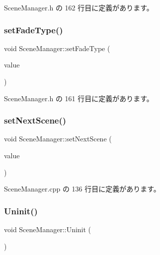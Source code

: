  Scene\+Manager.\+h の 162 行目に定義があります。

\mbox{\label{class_scene_manager_a95bb32ee4d3461bf56381d288a98c61b}} 
\subsubsection{\texorpdfstring{set\+Fade\+Type()}{setFadeType()}}
{\footnotesize\ttfamily void Scene\+Manager\+::set\+Fade\+Type (\begin{DoxyParamCaption}\item[{\mbox{\hyperlink{class_fade_ac06f27215b454aa05b93c236476d6e80}{Fade\+::\+Type}}}]{value }\end{DoxyParamCaption})\hspace{0.3cm}{\ttfamily [inline]}}



 Scene\+Manager.\+h の 161 行目に定義があります。

\mbox{\label{class_scene_manager_a208cc1690dcb260ae7fb94d13118f6ce}} 
\subsubsection{\texorpdfstring{set\+Next\+Scene()}{setNextScene()}}
{\footnotesize\ttfamily void Scene\+Manager\+::set\+Next\+Scene (\begin{DoxyParamCaption}\item[{\mbox{\hyperlink{class_scene_base}{Scene\+Base}} $\ast$}]{value }\end{DoxyParamCaption})}



 Scene\+Manager.\+cpp の 136 行目に定義があります。

\mbox{\label{class_scene_manager_ae3ff21f2261fc50f1e860cf7fc3a2108}} 
\subsubsection{\texorpdfstring{Uninit()}{Uninit()}}
{\footnotesize\ttfamily void Scene\+Manager\+::\+Uninit (\begin{DoxyParamCaption}{ }\end{DoxyParamCaption})}



